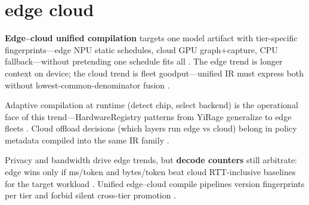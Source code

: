 \section{edge cloud}
\label{sec:ch27_edge_cloud}

\textbf{Edge--cloud unified compilation} targets one model artifact with tier-specific fingerprints---edge NPU static schedules, cloud GPU graph+capture, CPU fallback---without pretending one schedule fits all \citep{amd2024xdna,amd2024aie,yirage2026,chen2020compilerbasedhardw,patel2025llminference,kwon2023vllm,liu2024deepseekv3,memoryfloor2026,taxbreak2026,dlbook,semianalysis2024tma,dao2022flashattention,dao2023flashdecoding,nvidia2024cudagraphs,nvidia2022hopper,amd2024xdna}. The edge trend is longer context on device; the cloud trend is fleet goodput---unified IR must express both without lowest-common-denominator fusion \citep{patel2025llminference,kwon2023vllm,yirage2026,chen2020compilerbasedhardw,liu2024deepseekv3,memoryfloor2026,taxbreak2026,amd2024aie,dlbook,semianalysis2024tma,amd2024xdna,dao2022flashattention,dao2023flashdecoding,nvidia2024cudagraphs,nvidia2022hopper}.

Adaptive compilation at runtime (detect chip, select backend) is the operational face of this trend---HardwareRegistry patterns from YiRage generalize to edge fleets \citep{yirage2026,chen2020compilerbasedhardw,amd2024xdna,amd2024aie,kwon2023vllm,patel2025llminference,liu2024deepseekv3,memoryfloor2026,taxbreak2026,dlbook,semianalysis2024tma,dao2022flashattention,dao2023flashdecoding,nvidia2024cudagraphs,nvidia2022hopper}. Cloud offload decisions (which layers run edge vs cloud) belong in policy metadata compiled into the same IR family \citep{patel2025llminference,yirage2026,chen2020compilerbasedhardw,kwon2023vllm,liu2024deepseekv3,memoryfloor2026,taxbreak2026,amd2024aie,dlbook,semianalysis2024tma,amd2024xdna,dao2022flashattention,dao2023flashdecoding,nvidia2024cudagraphs,nvidia2022hopper,amd2024xdna}.

Privacy and bandwidth drive edge trends, but \textbf{decode counters} still arbitrate: edge wins only if ms/token and bytes/token beat cloud RTT-inclusive baselines for the target workload \citep{patel2025llminference,dlbook,memoryfloor2026,taxbreak2026,yirage2026,chen2020compilerbasedhardw,kwon2023vllm,liu2024deepseekv3,amd2024aie,semianalysis2024tma,amd2024xdna,dao2022flashattention,dao2023flashdecoding,nvidia2024cudagraphs,nvidia2022hopper}. Unified edge--cloud compile pipelines version fingerprints per tier and forbid silent cross-tier promotion \citep{yirage2026,chen2020compilerbasedhardw,patel2025llminference,kwon2023vllm,liu2024deepseekv3,memoryfloor2026,taxbreak2026,amd2024aie,dlbook,semianalysis2024tma,amd2024xdna,dao2022flashattention,dao2023flashdecoding,nvidia2024cudagraphs,nvidia2022hopper,amd2024xdna}.

